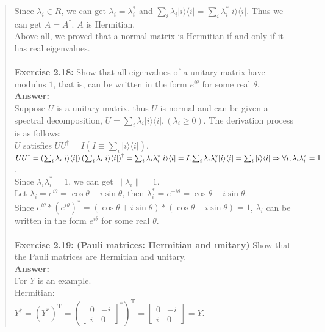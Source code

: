 \documentclass[UTF8]{ctexart}
\begin{document}
\begin{quote}
	Since $\lambda_{i} \in R$, we can get $\lambda_{i} =\lambda_{i}^{*}$ and $\sum_{i}\lambda_{i}|i\rangle\langle i|= \sum_{i}\lambda_{i}^{*}|i\rangle\langle i|$. Thus we can get $A=A^{\dagger}$. $A$ is  Hermitian. \\
	Above all, we proved that a normal matrix is Hermitian if and only if it has real eigenvalues.
	\\ \\
\textbf{Exercise 2.18:} Show that all eigenvalues of a unitary matrix have modulus $1$, that is, can be written in the form $e^{i\theta}$ for some real ${\theta}$. \\
\textbf{Answer:}\\

	 Suppose $U$ is a unitary matrix, thus $U$ is normal and can be given a spectral decomposition, $U= \sum_{i}\lambda_{i}|i\rangle\langle i|, (\lambda_{i}\geq 0)$.  The derivation process is as follows: \\
	$U$ satisfies $UU^{\dagger}=I(I \equiv \sum_{i}|i\rangle\langle i|).$ \\
	${U U^{\dagger}=\left(\sum_{i} \lambda_{i}|i\rangle \langle i|\right)\left(\sum_{i} \lambda_{i}|i\rangle\langle i|\right)^{\dagger}=\sum_{i} \lambda_{i} \lambda_{i}^{*}|i\rangle\langle i|=I}. \\ {\sum_{i} \lambda_{i} \lambda_{i}^{*}|i\rangle\langle i|=\sum_{i}| i\rangle\langle i| \Rightarrow \forall i, \lambda_{i} \lambda_{i}^{*}=1}$.
	\\
	Since $\lambda_{i} \lambda_{i}^{*}=1$,  we can get $\left\|\lambda_{i}\right\|=1$. \\ 
	Let $\lambda_{i}={e}^{i \theta}=\cos \theta+{i} \sin \theta$, then $ \lambda_{i}^{*}={e}^{-i \theta}=\cos \theta-{i} \sin \theta.$
	\\
	Since ${e}^{i \theta}*({e}^{i \theta})^{*}=(\cos \theta+{i} \sin \theta)*(\cos \theta-{i} \sin \theta)=1$, $\lambda_{i}$ can be written in the form ${e}^{i \theta}$ for some real $\theta$.
	\\
	\\  
\textbf{Exercise 2.19: (Pauli matrices: Hermitian and unitary)} Show that the Pauli matrices are Hermitian and unitary. 
\\
\textbf{Answer:}\\
	For $Y$ is an example.\\
	Hermitian:\\
	$Y^{\dagger}=\left(Y^{*}\right)^{\mathrm{T}}=\left(\left[\begin{array}{cc}{0} & {-i} \\ {i} & {0}\end{array}\right]^{\mathrm{*}}	\right)^{\mathrm{T}}=\left[\begin{array}{cc}{0} & {-i} \\ {i} & {0}\end{array}\right]=Y.$ 

\end{quote}
\end{document}
